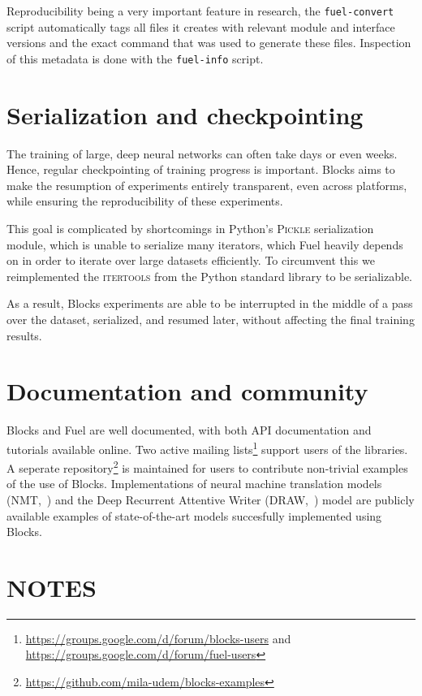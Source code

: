 \documentclass[twoside,11pt]{article}
\begin{document}
Reproducibility being a very important feature in research, the
\lstinline$fuel-convert$ script automatically tags all files it creates with
relevant module and interface versions and the exact command that was used to
generate these files. Inspection of this metadata is done with the
\lstinline$fuel-info$ script.

\section{Serialization and checkpointing}

The training of large, deep neural networks can often take days or even weeks.
Hence, regular checkpointing of training progress is important. Blocks aims to
make the resumption of experiments entirely transparent, even across platforms,
while ensuring the reproducibility of these experiments.

This goal is complicated by shortcomings in Python's \textsc{Pickle}
serialization module, which is unable to serialize many iterators, which Fuel
heavily depends on in order to iterate over large datasets efficiently. To
circumvent this we reimplemented the \textsc{itertools} from the Python
standard library to be serializable.

As a result, Blocks experiments are able to be interrupted in the middle of a
pass over the dataset, serialized, and resumed later, without affecting the
final training results.

\section{Documentation and community}

Blocks and Fuel are well documented, with both API documentation and tutorials
available online. Two active mailing
lists\footnote{\url{https://groups.google.com/d/forum/blocks-users} and
\url{https://groups.google.com/d/forum/fuel-users}} support users of the
libraries. A seperate
repository\footnote{\url{https://github.com/mila-udem/blocks-examples}} is
maintained for users to contribute non-trivial examples of the use of Blocks.
Implementations of neural machine translation models
(NMT,~\cite{bahdanau2015neural}) and the Deep Recurrent Attentive Writer
(DRAW,~\cite{gregor2015draw}) model are publicly available examples of
state-of-the-art models succesfully implemented using Blocks.

\section{NOTES}
\end{document}
